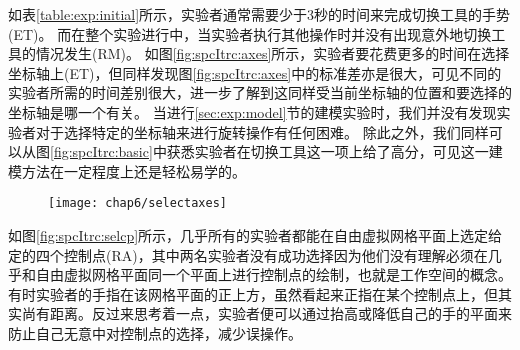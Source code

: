 

如表\ref{table:exp:initial}所示，实验者通常需要少于3秒的时间来完成切换工具的手势(ET)。
而在整个实验进行中，当实验者执行其他操作时并没有出现意外地切换工具的情况发生(RM)。
如图\ref{fig:spcItrc:axes}所示，实验者要花费更多的时间在选择坐标轴上(ET)，但同样发现图\ref{fig:spcItrc:axes}中的标准差亦是很大，可见不同的实验者所需的时间差别很大，进一步了解到这同样受当前坐标轴的位置和要选择的坐标轴是哪一个有关。
当进行\ref{sec:exp:model}节的建模实验时，我们并没有发现实验者对于选择特定的坐标轴来进行旋转操作有任何困难。
除此之外，我们同样可以从图\ref{fig:spcItrc:basic}中获悉实验者在切换工具这一项上给了高分，可见这一建模方法在一定程度上还是轻松易学的。
\begin{figure}[!htp]
  \centering
  \texttt{[image: chap6/selectaxes]}
\end{figure}

如图\ref{fig:spcItrc:selcp}所示，几乎所有的实验者都能在自由虚拟网格平面上选定给定的四个控制点(RA)，其中两名实验者没有成功选择因为他们没有理解必须在几乎和自由虚拟网格平面同一个平面上进行控制点的绘制，也就是工作空间的概念。
有时实验者的手指在该网格平面的正上方，虽然看起来正指在某个控制点上，但其实尚有距离。反过来思考着一点，实验者便可以通过抬高或降低自己的手的平面来防止自己无意中对控制点的选择，减少误操作。


